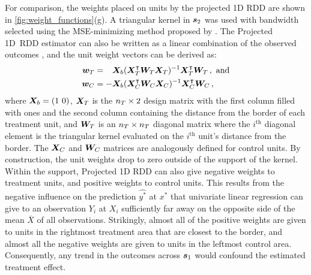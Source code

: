 	For comparison, the weights placed on units by the projected 1D RDD are shown in \autoref{fig:weight_functions}(g).
A triangular kernel in \(\bm{s}_2\) was used with bandwidth selected using the MSE-minimizing method proposed by \cite{imbens2012optimal}.
The Projected 1D~RDD estimator can also be written as a linear combination of the observed outcomes , and the unit weight vectors can be derived as:
\begin{equation}
\begin{split}
\bm{w}_{T} &= \hphantom{-} \bm{X}_b (\bm{X}_T^{\intercal} \bm{W}_T \bm{X}_T)^{-1} \bm{X}_T^{\intercal} \bm{W}_T \,, 
\text{ and}
\\
\bm{w}_{C} &= - \bm{X}_b (\bm{X}_C^{\intercal} \bm{W}_C \bm{X}_C)^{-1} \bm{X}_C^{\intercal} \bm{W}_C \,, 
\end{split}
\label{eq:unit_weights_llr}
\end{equation}
where \(\bm{X}_b = \left\lparen1~0\right\rparen\), \(\bm{X}_T\) is the \(n_T \times 2\) design matrix with the first column filled with ones and the second column containing the distance from the border of each treatment unit, and \(\bm{W}_T\) is an \(n_T \times n_T\) diagonal matrix where the \(i^\mathrm{th}\) diagonal element is the triangular kernel evaluated on the \(i^\mathrm{th}\) unit's distance from the border.
The \(\bm{X}_C\) and \(\bm{W}_C\) matrices are analogously defined for control units.
By construction, the unit weights drop to zero outside of the support of the kernel.
Within the support, Projected 1D RDD can also give negative weights to treatment units, and positive weights to control units.
This results from the negative influence on the prediction \(\widehat{y^*}\) at \(x^*\) that univariate linear regression can give to an observation \(Y_i\) at \(X_i\) sufficiently far away on the opposite side of the mean \(\overline{X}\) of all observations.
Strikingly, almost all of the positive weights are given to units in the rightmost treatment area that are closest to the border, and almost all the negative weights are given to units in the leftmost control area.
Consequently, any trend in the outcomes across \(\bm{s}_1\) would confound the estimated treatment effect.

